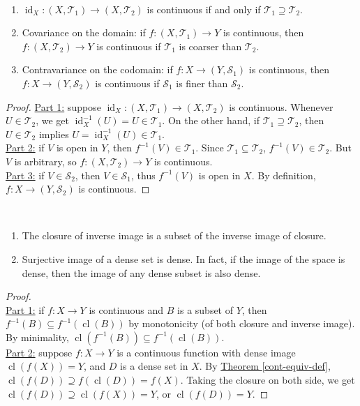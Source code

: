 \documentclass{treatise}
\begin{document}
\begin{proposition} \label{comp-topo-cont} \ 
\begin{enumerate}
    \item $\operatorname{id}_X : (X, \mathcal{T}_1) \to (X, \mathcal{T}_2)$ is continuous if and only if $\mathcal{T}_1 \supseteq \mathcal{T}_2$.
    \item Covariance on the domain: if $f: (X, \mathcal{T}_1) \to Y$ is continuous, then $f: (X, \mathcal{T}_2) \to Y$ is continuous if $\mathcal{T}_1$ is coarser than $\mathcal{T}_2$.
    \item Contravariance on the codomain: if $f: X \to (Y, \mathcal{S}_1)$ is continuous, then $f: X \to (Y, \mathcal{S}_2)$ is continuous if $\mathcal{S}_1$ is finer than $\mathcal{S}_2$.
\end{enumerate}
\end{proposition}
\begin{proof}
\underline{Part 1:} suppose $\operatorname{id}_X : (X, \mathcal{T}_1) \to (X, \mathcal{T}_2)$ is continuous. Whenever $U \in \mathcal{T}_2$, we get $\operatorname{id}_X^{-1}(U) = U \in \mathcal{T}_1$. On the other hand, if $\mathcal{T}_1 \supseteq \mathcal{T}_2$, then $U \in \mathcal{T}_2$ implies $U = \operatorname{id}_X^{-1}(U) \in \mathcal{T}_1$.
\\
\underline{Part 2:} if $V$ is open in $Y$, then $f^{-1}(V) \in \mathcal{T}_1$. Since $\mathcal{T}_1 \subseteq \mathcal{T}_2$, $f^{-1}(V) \in \mathcal{T}_2$. But $V$ is arbitrary, so $f: (X, \mathcal{T}_2) \to Y$ is continuous.
\\
\underline{Part 3:} if $V \in \mathcal{S}_2$, then $V \in \mathcal{S}_1$, thus $f^{-1}(V)$ is open in $X$. By definition, $f: X \to (Y, \mathcal{S}_2)$ is continuous.
\end{proof}
\begin{proposition} \ 
\begin{enumerate}
    \item The closure of inverse image is a subset of the inverse image of closure.
    \item Surjective image of a dense set is dense. In fact, if the image of the space is dense, then the image of any dense subset is also dense.
\end{enumerate}
\end{proposition}
\begin{proof} \ \\
\underline{Part 1:} if $f: X \to Y$ is continuous and $B$ is a subset of $Y$, then $f^{-1}(B) \subseteq f^{-1}(\operatorname{cl}(B))$ by monotonicity (of both closure and inverse image). By minimality, $\operatorname{cl}(f^{-1}(B)) \subseteq f^{-1}(\operatorname{cl}(B))$.
\\
\underline{Part 2:} suppose $f: X \to Y$ is a continuous function with dense image $\operatorname{cl}(f(X)) = Y$, and $D$ is a dense set in $X$. By \hyperref[cont-equiv-def]{Theorem \ref*{cont-equiv-def}}, $\operatorname{cl}(f(D)) \supseteq f(\operatorname{cl}(D)) = f(X)$. Taking the closure on both side, we get $\operatorname{cl}(f(D)) \supseteq \operatorname{cl}(f(X)) = Y$, or $\operatorname{cl}(f(D)) = Y$.
\end{proof}
\end{document}
